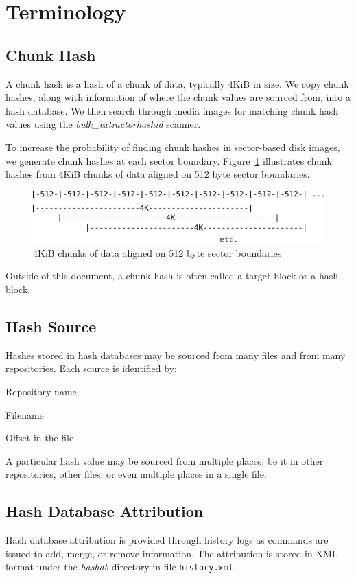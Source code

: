 \documentclass[11pt,twoside]{article}
\newcommand \bulk {\textit{bulk\_extractor}\xspace}
\newcommand \hdb {\textit{hashdb}\xspace}
\newcommand \hid {\textit{hashid}\xspace}
\begin{document}
\section{Terminology}

\subsection{Chunk Hash}
A chunk hash is a hash of a chunk of data,
typically 4KiB in size.
We copy chunk hashes, along with information of where the chunk values
are sourced from, into a hash database.
We then search through media images for matching chunk hash values
using the \bulk \hid scanner.

To increase the probability of finding chunk hashes in sector-based
disk images, we generate chunk hashes at each sector boundary.
Figure~\ref{fig:sector_boundaries} illustrates chunk hashes
from 4KiB chunks of data aligned on 512 byte sector boundaries.
\begin{figure}[h]
	\center
	\includegraphics[scale=1.0]{drawings/sector_boundaries.pdf}
	\caption{4KiB chunks of data aligned on 512 byte sector boundaries}
	\label{fig:sector_boundaries}
\end{figure}

Outside of this document, a chunk hash is often
called a target block or a hash block.

\subsection{Hash Source}
Hashes stored in hash databases may be sourced from many files
and from many repositories.
Each source is identified by:
\begin{compactitem}
	\item Repository name
	\item Filename
	\item Offset in the file
\end{compactitem}

A particular hash value may be sourced from multiple places,
be it in other repositories, other files,
or even multiple places in a single file.

\subsection{Hash Database Attribution}
Hash database attribution is provided through history logs
as commands are issued to add, merge, or remove information.
The attribution is stored in XML format under the \hdb directory
in file \texttt{history.xml}.
\end{document}
